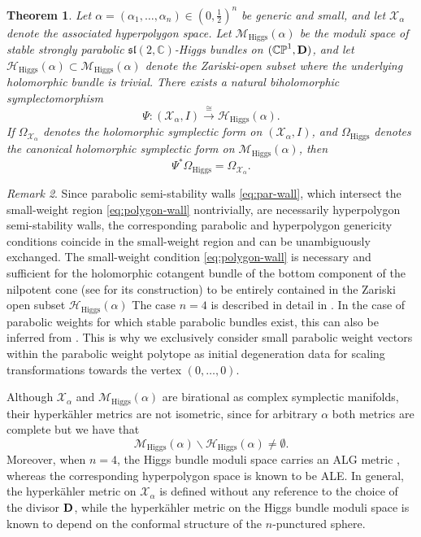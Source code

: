 \documentclass[12pt,a4paper]{amsart}
\newtheorem{theorem}{Theorem}[section]
\theoremstyle{definition}
\theoremstyle{remark}
\newtheorem{remark}[theorem]{Remark}
\newcommand{\C}{\mathbb C}
\newcommand{\CP}{\mathbb{CP}}
\begin{document}
\begin{theorem}\label{thm:GM-hyperpolygon-higgs}
{\cite{BiFloGoMa,GoMa}}
Let $\alpha=(\alpha_1,\dots,\alpha_n)\in (0,\frac{1}{2})^n$ be generic and small, and let
$\mathcal X_\alpha$ denote the associated hyperpolygon space.
Let $\mathcal M_{\mathrm{Higgs}}(\alpha)$ be the moduli space of stable 
\emph{strongly parabolic} $\mathfrak{sl}(2,\C)$-Higgs bundles on $(\CP^1,{\bf D})$, and let
$\mathcal H_{\mathrm{Higgs}}(\alpha)\subset\mathcal M_{\mathrm{Higgs}}(\alpha)$ denote
the Zariski-open subset where the underlying holomorphic bundle is trivial.
There exists a natural biholomorphic symplectomorphism
\[
\Psi\colon (\mathcal X_\alpha,I)\xrightarrow{\;\cong\;}
\mathcal H_{\mathrm{Higgs}}(\alpha).
\]
If
$\Omega_{\mathcal X_\alpha}$ denotes the holomorphic symplectic form on
$(\mathcal X_\alpha,I)$, and
$\Omega_{\mathrm{Higgs}}$ denotes the canonical holomorphic symplectic form on
$\mathcal M_{\mathrm{Higgs}}(\alpha)$, then
\[
\Psi^*\Omega_{\mathrm{Higgs}}=\Omega_{\mathcal X_\alpha}.
\]
\end{theorem}


\begin{remark}\label{rem:small-weight}
Since parabolic semi-stability walls \eqref{eq:par-wall}, which intersect  the small-weight region \eqref{eq:polygon-wall} nontrivially,
are necessarily hyperpolygon semi-stability walls, the corresponding parabolic and hyperpolygon genericity conditions coincide in the 
small-weight region and can be unambiguously exchanged. The small-weight condition \eqref{eq:polygon-wall} is necessary and sufficient
for the holomorphic cotangent bundle of the bottom component of the nilpotent cone (see \cite[section 4.2]{BY96} for its construction)
to be entirely contained in the Zariski open subset $\mathcal H_{\mathrm{Higgs}}(\alpha)$ The case $n=4$ is described in detail in \cite{MenesesSIGMA}.
In the case of parabolic weights for which stable parabolic bundles exist, this can also be inferred from \cite[remark 5.4]{AW98}.
This is why we exclusively consider small parabolic weight vectors within the parabolic weight polytope as initial degeneration data 
for scaling transformations towards the vertex $(0,\dots,0)$.
\end{remark}

Although $\mathcal X_\alpha$ and $\mathcal M_{\mathrm{Higgs}}(\alpha)$ are birational 
as complex symplectic manifolds, their hyperk\"ahler metrics are not isometric, since  for arbitrary $\alpha$ both metrics are complete but we have that
\[
\mathcal M_{\mathrm{Higgs}}(\alpha)\backslash \mathcal H_{\mathrm{Higgs}}(\alpha)\neq\emptyset. 
\]
Moreover,  
when $n=4$, the Higgs bundle moduli space carries an ALG metric \cite{FMSW}, whereas
the corresponding hyperpolygon space is known to be ALE.
In general, the hyperk\"ahler metric on $\mathcal X_\alpha$ is defined without any reference 
to the choice of the divisor $\bf{D}$, while the hyperk\"ahler metric on
the Higgs bundle moduli space is  known to depend on the conformal structure of the $n$-punctured sphere.
\end{document}

